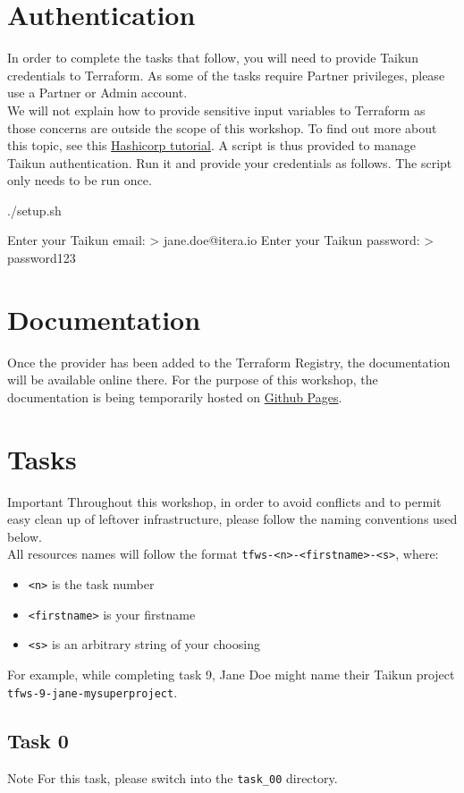 \section{Authentication}
In order to complete the tasks that follow, you will need to provide Taikun credentials to Terraform.
As some of the tasks require Partner privileges, please use a Partner or Admin account.\\

We will not explain how to provide sensitive input variables to Terraform as those concerns are outside the scope of this
workshop. %
To find out more about this topic, see this \href{https://learn.hashicorp.com/tutorials/terraform/sensitive-variables}{Hashicorp tutorial}.
A script is thus provided to manage Taikun authentication.
Run it and provide your credentials as follows. The script only needs to be run once.
\begin{shell}
./setup.sh
\end{shell}
\begin{raw}
Enter your Taikun email:
> jane.doe@itera.io
Enter your Taikun password:
> password123
\end{raw}

\section{Documentation}
Once the provider has been added to the Terraform Registry, the documentation will be available online there.
For the purpose of this workshop, the documentation is being temporarily hosted on \href{https://intuinewin.github.io/taikun-docs/}{Github Pages}.

\section{Tasks}
\begin{warn}{Important}
  Throughout this workshop, in order to avoid conflicts and
  to permit easy clean up of leftover infrastructure, please follow the naming conventions used below.\\

  All resources names will follow the format \texttt{tfws-<n>-<firstname>-<s>}, where:
  \begin{itemize}
    \item \texttt{<n>} is the task number
    \item \texttt{<firstname>} is your firstname
    \item \texttt{<s>} is an arbitrary string of your choosing
  \end{itemize}
  For example, while completing task 9, Jane Doe might name their Taikun project
  \texttt{tfws-9-jane-mysuperproject}.
\end{warn}

\subsection{Task 0}
\begin{note}{Note}
For this task, please switch into the \texttt{task\_00} directory.
\end{note}
\blindtext{}
